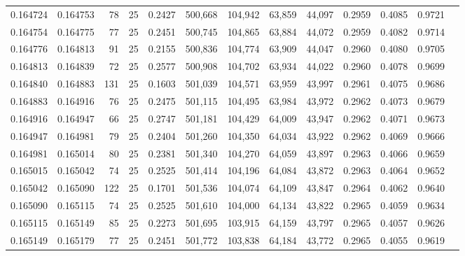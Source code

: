 \begin{tabular}{rrrrrrrrrrrrr}
0.164724 & 0.164753 &    78 &  25 &                                     0.2427 & 500,668 & 104,942 &  63,859 &  44,097 & 0.2959 & 0.4085 & 0.9721 \\
0.164754 & 0.164775 &    77 &  25 &                                     0.2451 & 500,745 & 104,865 &  63,884 &  44,072 & 0.2959 & 0.4082 & 0.9714 \\
0.164776 & 0.164813 &    91 &  25 &                                     0.2155 & 500,836 & 104,774 &  63,909 &  44,047 & 0.2960 & 0.4080 & 0.9705 \\
0.164813 & 0.164839 &    72 &  25 &                                     0.2577 & 500,908 & 104,702 &  63,934 &  44,022 & 0.2960 & 0.4078 & 0.9699 \\
0.164840 & 0.164883 &   131 &  25 &                                     0.1603 & 501,039 & 104,571 &  63,959 &  43,997 & 0.2961 & 0.4075 & 0.9686 \\
0.164883 & 0.164916 &    76 &  25 &                                     0.2475 & 501,115 & 104,495 &  63,984 &  43,972 & 0.2962 & 0.4073 & 0.9679 \\
0.164916 & 0.164947 &    66 &  25 &                                     0.2747 & 501,181 & 104,429 &  64,009 &  43,947 & 0.2962 & 0.4071 & 0.9673 \\
0.164947 & 0.164981 &    79 &  25 &                                     0.2404 & 501,260 & 104,350 &  64,034 &  43,922 & 0.2962 & 0.4069 & 0.9666 \\
0.164981 & 0.165014 &    80 &  25 &                                     0.2381 & 501,340 & 104,270 &  64,059 &  43,897 & 0.2963 & 0.4066 & 0.9659 \\
0.165015 & 0.165042 &    74 &  25 &                                     0.2525 & 501,414 & 104,196 &  64,084 &  43,872 & 0.2963 & 0.4064 & 0.9652 \\
0.165042 & 0.165090 &   122 &  25 &                                     0.1701 & 501,536 & 104,074 &  64,109 &  43,847 & 0.2964 & 0.4062 & 0.9640 \\
0.165090 & 0.165115 &    74 &  25 &                                     0.2525 & 501,610 & 104,000 &  64,134 &  43,822 & 0.2965 & 0.4059 & 0.9634 \\
0.165115 & 0.165149 &    85 &  25 &                                     0.2273 & 501,695 & 103,915 &  64,159 &  43,797 & 0.2965 & 0.4057 & 0.9626 \\
0.165149 & 0.165179 &    77 &  25 &                                     0.2451 & 501,772 & 103,838 &  64,184 &  43,772 & 0.2965 & 0.4055 & 0.9619 \\

\end{tabular}
